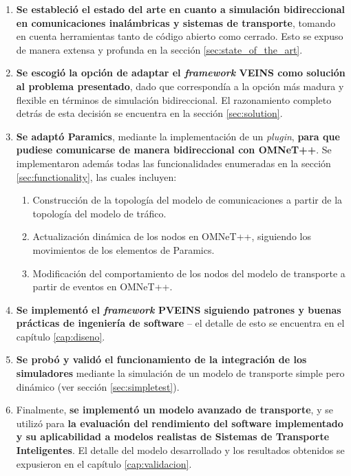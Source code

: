 \begin{enumerate}
    \item \textbf{Se estableció el estado del arte en cuanto a simulación bidireccional en comunicaciones inalámbricas y sistemas de transporte}, tomando en cuenta herramientas tanto de código abierto como cerrado. Esto se expuso de manera extensa y profunda en la sección \ref{sec:state_of_the_art}.
    
    \item \textbf{Se escogió la opción de adaptar el \emph{framework} VEINS como solución al problema presentado}, dado que correspondía a la opción más madura y flexible en términos de simulación bidireccional. El razonamiento completo detrás de esta decisión se encuentra en la sección \ref{sec:solution}.
    
    \item \textbf{Se adaptó Paramics}, mediante la implementación de un \emph{plugin}, \textbf{para que pudiese comunicarse de manera bidireccional con OMNeT++}. Se implementaron además todas las funcionalidades enumeradas en la sección \ref{sec:functionality}, las cuales incluyen:
    \begin{enumerate}
        
        \item Construcción de la topología del modelo de comunicaciones a partir de la topología del modelo de tráfico.
        
        \item Actualización dinámica de los nodos en OMNeT++, siguiendo los movimientos de los elementos de Paramics.
        \item Modificación del comportamiento de los nodos del modelo de transporte a partir de eventos en OMNeT++.
    \end{enumerate}
    \item \textbf{Se implementó el \emph{framework} PVEINS siguiendo patrones y buenas prácticas de ingeniería de software} -- el detalle de esto se encuentra en el capítulo \ref{cap:diseno}.
    
    \item \textbf{Se probó y validó el funcionamiento de la integración de los simuladores} mediante la simulación de un modelo de transporte simple pero dinámico (ver sección \ref{sec:simpletest}).
    
    \item Finalmente, \textbf{se implementó un modelo avanzado de transporte}, y se utilizó para \textbf{la evaluación del rendimiento del software implementado y su aplicabilidad a modelos realistas de Sistemas de Transporte Inteligentes}. El detalle del modelo desarrollado y los resultados obtenidos se expusieron en el capítulo \ref{cap:validacion}.
\end{enumerate}